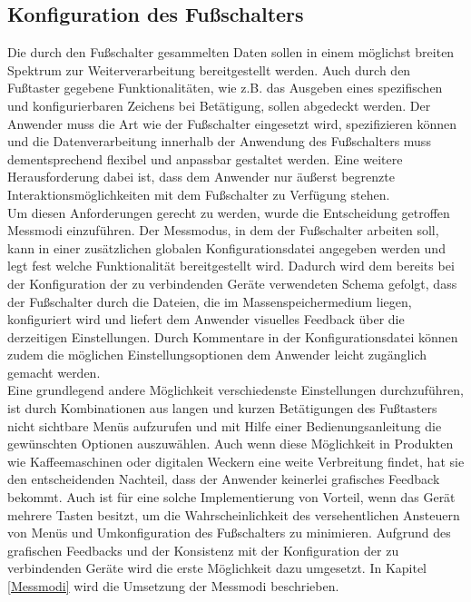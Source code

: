 \subsection{Konfiguration des Fußschalters}
Die durch den Fußschalter gesammelten Daten sollen in einem möglichst breiten Spektrum zur Weiterverarbeitung bereitgestellt werden. Auch durch den Fußtaster gegebene Funktionalitäten, wie z.B. das Ausgeben eines spezifischen und konfigurierbaren Zeichens bei Betätigung, sollen abgedeckt werden. Der Anwender muss die Art wie der Fußschalter eingesetzt wird, spezifizieren können und die Datenverarbeitung innerhalb der Anwendung des Fußschalters muss dementsprechend flexibel und anpassbar gestaltet werden. Eine weitere Herausforderung dabei ist, dass dem Anwender nur äußerst begrenzte Interaktionsmöglichkeiten mit dem Fußschalter zu Verfügung stehen.\\
Um diesen Anforderungen gerecht zu werden, wurde die Entscheidung getroffen Messmodi einzuführen. Der Messmodus, in dem der Fußschalter arbeiten soll, kann in einer zusätzlichen globalen Konfigurationsdatei angegeben werden und legt fest welche Funktionalität bereitgestellt wird. Dadurch wird dem bereits bei der Konfiguration der zu verbindenden Geräte verwendeten Schema gefolgt, dass der Fußschalter durch die Dateien, die im Massenspeichermedium liegen, konfiguriert wird und liefert dem Anwender visuelles Feedback über die derzeitigen Einstellungen. Durch Kommentare in der Konfigurationsdatei können zudem die möglichen Einstellungsoptionen dem Anwender leicht zugänglich gemacht werden.\\
Eine grundlegend andere Möglichkeit verschiedenste Einstellungen durchzuführen, ist durch Kombinationen aus langen und kurzen Betätigungen des Fußtasters nicht sichtbare Menüs aufzurufen und mit Hilfe einer Bedienungsanleitung die gewünschten Optionen auszuwählen. Auch wenn diese Möglichkeit in Produkten wie Kaffeemaschinen oder digitalen Weckern eine weite Verbreitung findet, hat sie den entscheidenden Nachteil, dass der Anwender keinerlei grafisches Feedback bekommt. Auch ist für eine solche Implementierung von Vorteil, wenn das Gerät mehrere Tasten besitzt, um die Wahrscheinlichkeit des versehentlichen Ansteuern von Menüs und Umkonfiguration des Fußschalters zu minimieren. Aufgrund des grafischen Feedbacks und der Konsistenz mit der Konfiguration der zu verbindenden Geräte wird die erste Möglichkeit dazu umgesetzt. In Kapitel \ref{Messmodi} wird die Umsetzung der Messmodi beschrieben.\\
